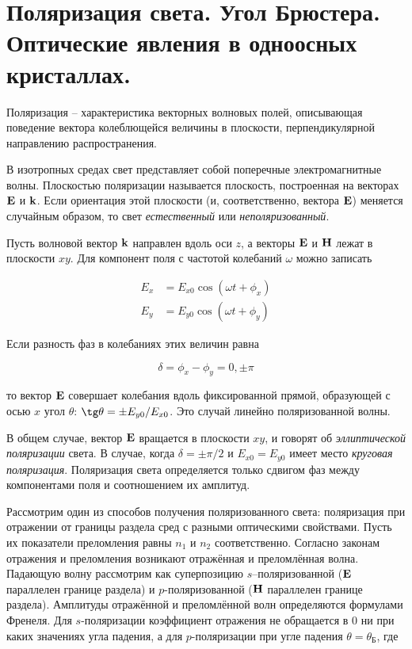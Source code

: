 \section{Поляризация света. Угол Брюстера. Оптические явления в одноосных кристаллах.}

\begin{definition}
    Поляризация -- характеристика векторных волновых полей, описывающая поведение вектора колеблющейся величины в плоскости, перпендикулярной направлению распространения.
\end{definition}

В изотропных средах свет представляет собой поперечные электромагнитные волны. Плоскостью поляризации называется плоскость, построенная на векторах $\mathbf E$ и $\mathbf k$. Если ориентация этой плоскости (и, соответственно, вектора $\mathbf E$) меняется случайным образом, то свет \textit{естественный} или \textit{неполяризованный}.

Пусть волновой вектор $\mathbf k$ направлен вдоль оси $z$, а векторы $\mathbf E$ и $\mathbf H$ лежат в плоскости $x y$. Для компонент поля с частотой колебаний $\omega$ можно записать

\begin{align}
    E_x &= E_{x 0} \cos \left( \omega t + \phi_x \right) \\
    E_y &= E_{y 0} \cos \left( \omega t + \phi_y \right)
\end{align}

Если разность фаз в колебаниях этих величин равна

\begin{equation}
    \delta = \phi_x - \phi_y = 0, \pm \pi
\end{equation}

\noindent
то вектор $\mathbf E$ совершает колебания вдоль фиксированной прямой, образующей с осью $x$ угол $\theta$: $\tg \theta = \pm E_{y 0} / E_{x 0}$. Это случай линейно поляризованной волны.

В общем случае, вектор $\mathbf E$ вращается в плоскости $x y$, и говорят об \textit{эллиптической поляризации} света. В случае, когда $\delta = \pm \pi / 2$ и $E_{x 0} = E_{y 0}$ имеет место \textit{круговая поляризация}. Поляризация света определяется только сдвигом фаз между компонентами поля и соотношением их амплитуд.

Рассмотрим один из способов получения поляризованного света: поляризация при отражении от границы раздела сред с разными оптическими свойствами. Пусть их показатели преломления равны $n_1$ и $n_2$ соответственно. Согласно законам отражения и преломления возникают отражённая и преломлённая волна. Падающую волну рассмотрим как суперпозицию $s$--поляризованной ($\mathbf E$ параллелен границе раздела) и $p$-поляризованной ($\mathbf H$ параллелен границе раздела). Амплитуды отражённой и преломлённой волн определяются формулами Френеля. Для $s$-поляризации коэффициент отражения не обращается в $0$ ни при каких значениях угла падения, а для $p$-поляризации при угле падения $\theta = \theta_\text{Б}$, где

